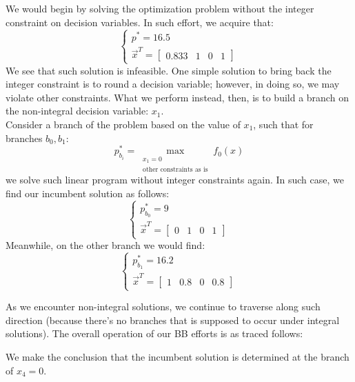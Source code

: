 We would begin by solving the optimization problem without the integer constraint on decision variables.
In such effort, we acquire that:
\[
    \begin{cases}
        p^* = 16.5 \\
        \vec{x}^T = \begin{bmatrix} 0.833 & 1 & 0 & 1 \end{bmatrix}
    \end{cases}
\]
We see that such solution is infeasible.
One simple solution to bring back the integer constraint is to round a decision variable; however, in doing so, we may violate other constraints.
What we perform instead, then, is to build a branch on the non-integral decision variable: $x_1$. \\
Consider a branch of the problem based on the value of $x_1$, such that for branches $b_0, b_1$:
\[
    p_{b_i}^* = \max_{
        \substack{
            x_1 = 0 \\
            \text{other constraints as is}
        }
    } f_0(x)
\]
we solve such linear program without integer constraints again.
In such case, we find our incumbent solution as follows:
\[
    \begin{cases}
        p_{b_0}^* = 9 \\
        \vec{x}^T = \begin{bmatrix} 0 & 1 & 0 & 1 \end{bmatrix}
    \end{cases}
\]
Meanwhile, on the other branch we would find:
\[
    \begin{cases}
        p_{b_1}^* = 16.2 \\
        \vec{x}^T = \begin{bmatrix} 1 & 0.8 & 0 & 0.8 \end{bmatrix}
    \end{cases}
\]

As we encounter non-integral solutions, we continue to traverse along such direction (because there's no branches that is supposed to occur under integral solutions).
The overall operation of our BB efforts is as traced follows:
\begin{center}
\end{center}
We make the conclusion that the incumbent solution is determined at the branch of $x_4 = 0$.

